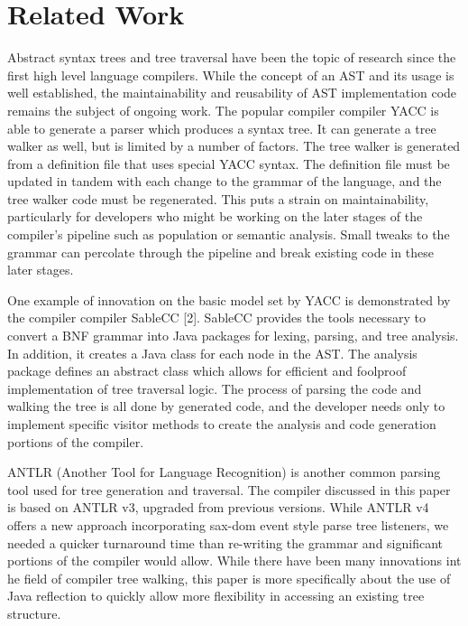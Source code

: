 \documentclass[times]{speauth}
\begin{document}
\vspace{-6pt}

\section{Related Work}
\vspace{-2pt}

Abstract syntax trees and tree traversal have been the topic of research since the first high level language compilers. While the concept of an AST and its usage is well established, the maintainability and reusability of AST implementation code remains the subject of ongoing work. The popular compiler compiler YACC is able to generate a parser which produces a syntax tree. It can generate a tree walker as well, but is limited by a number of factors. The tree walker is generated from a definition file that uses special YACC syntax. The definition file must be updated in tandem with each change to the grammar of the language, and the tree walker code must be regenerated. This puts a strain on maintainability, particularly for developers who might be working on the later stages of the compiler's pipeline such as population or semantic analysis. Small tweaks to the grammar can percolate through the pipeline and break existing code in these later stages. 

One example of innovation on the basic model set by YACC is demonstrated by the compiler compiler SableCC [2]. SableCC provides the tools necessary to convert a BNF grammar into Java packages for lexing, parsing, and tree analysis. In addition, it creates a Java class for each node in the AST. The analysis package defines an abstract class which allows for efficient and foolproof implementation of tree traversal logic. The process of parsing the code and walking the tree is all done by generated code, and the developer needs only to implement specific visitor methods to create the analysis and code generation portions of the compiler.

ANTLR (Another Tool for Language Recognition) is another common parsing tool used for tree generation and traversal. The compiler discussed in this paper is based on ANTLR v3, upgraded from previous versions. While ANTLR v4 offers a new approach incorporating sax-dom event style parse tree listeners, we needed a quicker turnaround time than re-writing the grammar and significant portions of the compiler would allow. While there have been many innovations int he field of compiler tree walking, this paper is more specifically about the use of Java reflection to quickly allow more flexibility in accessing an existing tree structure.
\end{document}
